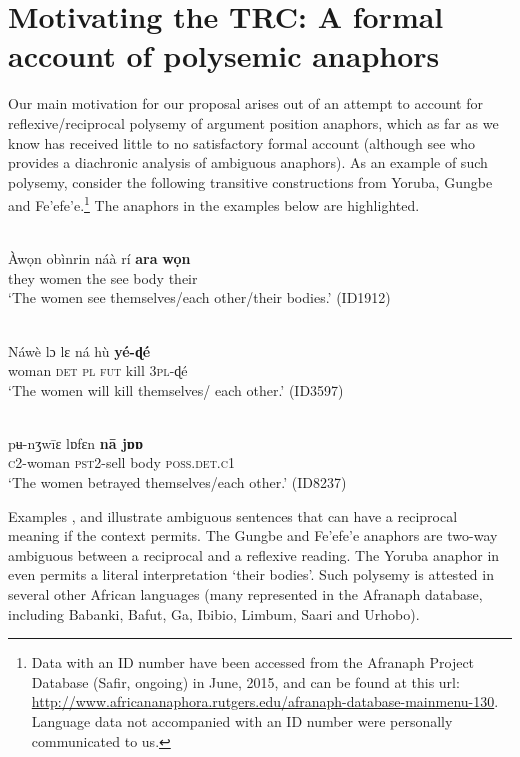 \documentclass[output=paper]{langsci/langscibook}
\begin{document}
 
\section{Motivating the TRC: A formal account of polysemic anaphors}



  Our main motivation for our proposal arises out of an attempt to account for reflexive/reciprocal polysemy of argument position anaphors, which as far as we know has received little to no satisfactory formal account (although see \citealt{Heine1999} who provides a diachronic analysis of ambiguous anaphors). As an example of such polysemy, consider the following transitive constructions from Yoruba, Gungbe and Fe'efe'e.\footnote{ Data with an ID number have been accessed from the Afranaph Project Database (Safir, ongoing) in June, 2015, and can be found at this url: \url{http://www.africananaphora.rutgers.edu/afranaph-database-mainmenu-130}. Language data not accompanied with an ID number were personally communicated to us.} The anaphors in the examples below are highlighted.




\ea\label{ex:}
 \\
\gll Àwọn     obìnrin   náà  rí   \textbf{{ara}}   \textbf{{wọn}} \\
they     women   the   see   body   their\\
\glt  ‘The women see themselves/each other/their bodies.’ {(ID1912)}
\z


\ea\label{ex:}
 \\
\gll Náwè     lɔ  lɛ  ná  hù  \textbf{yé-ɖé} \\
woman    \textsc{det}  \textsc{pl}  \textsc{fut}  kill  \textsc{3pl}-ɖé \\
\glt ‘The women will kill themselves/ each other.’ (ID3597) 
\z


\ea\label{ex:}
 \\
\gll pʉ-nʒw\={i}ɛ   lɒfɛn     \textbf{n\={a}   jɒɒ} \\
  \textsc{c}{2-woman}   {\textsc{pst2}}-sell   body   \textsc{poss.det.c1}\\
\glt ‘The women betrayed themselves/each other.’ {(ID8237)} 
\z


Examples ,  and  illustrate ambiguous sentences that can have a reciprocal meaning if the context permits. The Gungbe and Fe'efe'e anaphors are two-way ambiguous between a reciprocal and a reflexive reading. The Yoruba anaphor in  even permits a literal interpretation ‘their bodies’. Such polysemy is attested in several other African languages (many represented in the Afranaph database, including Babanki, Bafut, Ga, Ibibio, Limbum, Saari and Urhobo).
\end{document}

